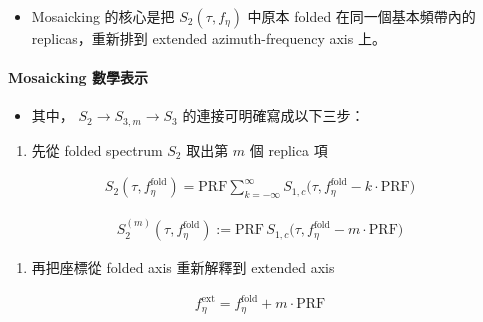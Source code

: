 \documentclass[11pt]{article}
\providecommand{\tightlist}{%
  \setlength{\itemsep}{0pt}\setlength{\parskip}{0pt}}
\begin{document}
\begin{itemize}
\tightlist
\item
  Mosaicking 的核心是把 \(S_2(\tau,f_\eta)\) 中原本 folded
  在同一個基本頻帶內的 replicas，重新排到 extended azimuth-frequency
  axis 上。
\end{itemize}

\hypertarget{mosaicking-ux6578ux5b78ux8868ux793a}{%
\paragraph{Mosaicking
數學表示}\label{mosaicking-ux6578ux5b78ux8868ux793a}}

\begin{itemize}
\tightlist
\item
  其中， \(S_2 \rightarrow S_{3,m} \rightarrow S_3\)
  的連接可明確寫成以下三步：
\end{itemize}

\begin{enumerate}
\def\labelenumi{\arabic{enumi})}
\tightlist
\item
  先從 folded spectrum \(S_2\) 取出第 \(m\) 個 replica 項
\end{enumerate}

\begin{equation}
\begin{aligned}
S_2(\tau,f_\eta^{\mathrm{fold}})
= \mathrm{PRF}\sum_{k=-\infty}^{\infty}S_{1,c}\biggl(\tau,f_\eta^{\mathrm{fold}}-k\cdot\mathrm{PRF}\biggr)
\end{aligned}
\end{equation}

\begin{equation}
\begin{aligned}
S_2^{(m)}(\tau,f_\eta^{\mathrm{fold}})
:= \mathrm{PRF}\,S_{1,c}\biggl(\tau,f_\eta^{\mathrm{fold}}-m\cdot\mathrm{PRF}\biggr)
\end{aligned}
\end{equation}

\begin{enumerate}
\def\labelenumi{\arabic{enumi})}
\setcounter{enumi}{1}
\tightlist
\item
  再把座標從 folded axis 重新解釋到 extended axis
\end{enumerate}

\begin{equation}
\begin{aligned}
f_\eta^{\mathrm{ext}}=f_\eta^{\mathrm{fold}}+m\cdot\mathrm{PRF}
\end{aligned}
\end{equation}
\end{document}
